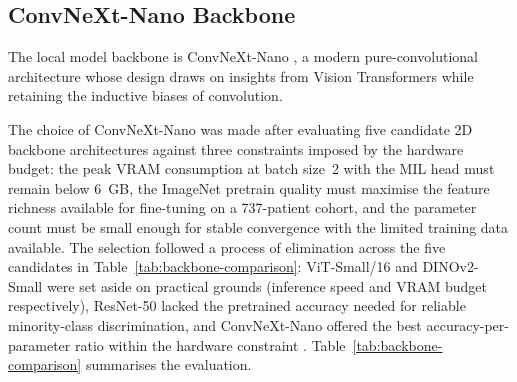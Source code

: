 \subsection{ConvNeXt-Nano Backbone}
\label{sec:convnext-backbone}

The local model backbone is ConvNeXt-Nano
\cite{liu2022convnet}, a modern pure-convolutional
architecture whose design draws on insights from Vision
Transformers while retaining the inductive biases of
convolution.

The choice of ConvNeXt-Nano was made after evaluating
five candidate 2D backbone architectures against three
constraints imposed by the hardware budget: the peak
VRAM consumption at batch size~2 with the MIL head
must remain below 6~GB, the ImageNet pretrain quality
must maximise the feature richness available for
fine-tuning on a 737-patient cohort, and the parameter
count must be small enough for stable convergence with
the limited training data available.
The selection followed a process of elimination across
the five candidates in Table~\ref{tab:backbone-comparison}:
ViT-Small/16 and DINOv2-Small were set aside on practical
grounds (inference speed and VRAM budget respectively),
ResNet-50 lacked the pretrained accuracy needed for
reliable minority-class discrimination, and ConvNeXt-Nano
offered the best accuracy-per-parameter ratio within the
hardware constraint \cite{liu2022convnet}.
Table~\ref{tab:backbone-comparison} summarises the
evaluation.

\begin{table}[htbp]
  \centering
  \caption{Candidate backbone architectures evaluated
    against the 6~GB VRAM budget. VRAM estimates
    correspond to batch size~2 with 64 slices per
    volume and the Gated Attention MIL head attached.
    Top-1 accuracy on ImageNet-1k is reported for the
    best available pretrained checkpoint.}
  \label{tab:backbone-comparison}
  \renewcommand{\arraystretch}{1.3}
\end{table}


